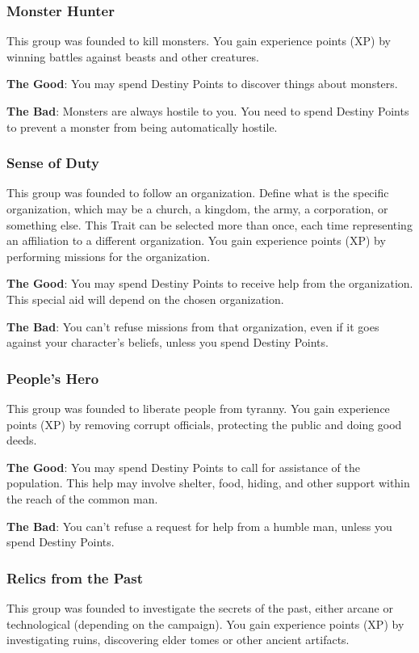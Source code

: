 \begin{multicols}{2}
\subsubsection{Monster Hunter}
This group was founded to kill monsters. You gain experience points (XP) by winning battles against beasts and other creatures.

\textbf{The Good}: You may spend Destiny Points to discover things about monsters.

\textbf{The Bad}: Monsters are always hostile to you. You need to spend Destiny Points to prevent a monster from being automatically hostile.

\subsubsection{Sense of Duty}
This group was founded to follow an organization. Define what is the specific organization, which may be a church, a kingdom, the army, a corporation, or something else. This Trait can be selected more than once, each time representing an affiliation to a different organization. You gain experience points (XP) by performing missions for the organization.

\textbf{The Good}: You may spend Destiny Points to receive help from the organization. This special aid will depend on the chosen organization.

\textbf{The Bad}: You can’t refuse missions from that organization, even if it goes against your character’s beliefs, unless you spend Destiny Points.

\subsubsection{People’s Hero}
This group was founded to liberate people from tyranny. You gain experience points (XP) by removing corrupt officials, protecting the public and doing good deeds.

\textbf{The Good}: You may spend Destiny Points to call for assistance of the population. This help may involve shelter, food, hiding, and other support within the reach of the common man.

\textbf{The Bad}: You can’t refuse a request for help from a humble man, unless you spend Destiny Points.

\begin{ffcolpage}
\subsubsection{Relics from the Past}
This group was founded to investigate the secrets of the past, either arcane or technological (depending on the campaign). You gain experience points (XP) by investigating ruins, discovering elder tomes or other ancient artifacts.


\end{ffcolpage}
\end{multicols}
